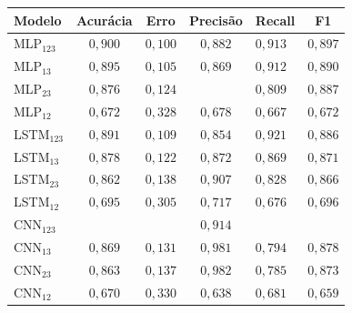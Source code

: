 \begin{minipage}{0.45\textwidth}
	\begin{tabular}{|p{1.5cm}|c|c|c|p{1cm}|c|}
		\hline
		Modelo&Acurácia&Erro&Precisão&Recall&F1 \\
		\hline
		MLP$_{123}$&$0,900$&$0,100$&$0,882$&$0,913$&$0,897$\\ \hline
		MLP$_{13}$&$0,895$&$0,105$&$0,869$&$0,912$&$0,890$\\ \hline
		MLP$_{23}$&$0,876$&$0,124$&\cellcolor{lightgray}{$0,983$}&$0,809$&$0,887$\\ \hline
		MLP$_{12}$&$0,672$&$0,328$&$0,678$&$0,667$&$0,672$\\ \hline
		
		LSTM$_{123}$&$0,891$&$0,109$&$0,854$&$0,921$&$0,886$\\ \hline
		LSTM$_{13}$&$0,878$&$0,122$&$0,872$&$0,869$&$0,871$\\ \hline
		LSTM$_{23}$&$0,862$&$0,138$&$0,907$&$0,828$&$0,866$\\ \hline
		LSTM$_{12}$&$0,695$&$0,305$&$0,717$&$0,676$&$0,696$\\ \hline
		
		CNN$_{123}$&\cellcolor{lightgray}{$0,926$}&\cellcolor{lightgray}{$0,074$}&$0,914$&\cellcolor{lightgray}{$0,931$}&\cellcolor{lightgray}{$0,923$}\\  \hline
		CNN$_{13}$&$0,869$&$0,131$&$0,981$&$0,794$&$0,878$\\ \hline
		CNN$_{23}$&$0,863$&$0,137$&$0,982$&$0,785$&$0,873$\\ \hline
		CNN$_{12}$&$0,670$&$0,330$&$0,638$&$0,681$&$0,659$\\ \hline
	\end{tabular}
	\label{tab:desempenhotestes}
\end{minipage}
\hfill
\endgroup
